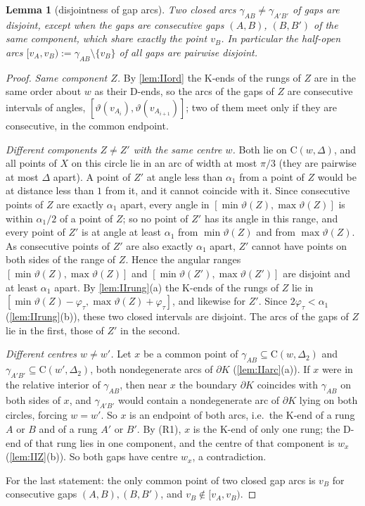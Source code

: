 \documentclass[11pt]{amsart}
\newtheorem{lemma}[theorem]{Lemma}
\theoremstyle{definition}
\theoremstyle{remark}
\newcommand{\Dt}{\Delta_2}
\newcommand{\Cc}{\mathrm{C}}      %
\begin{document}
\begin{lemma}[disjointness of gap arcs]\label{lem:IIdisj}
Two closed arcs $\gamma_{AB}\neq\gamma_{A'B'}$ of gaps are disjoint, except when the gaps are consecutive gaps $(A,B)$, $(B,B')$ of the same component, which share exactly the point $v_B$. In particular the half-open arcs $[v_A,v_B):=\gamma_{AB}\setminus\{v_B\}$ of all gaps are pairwise disjoint.
\end{lemma}
\begin{proof}
\emph{Same component $Z$.} By \cref{lem:IIord} the K-ends of the rungs of $Z$ are in the same order about $w$ as their D-ends, so the arcs of the gaps of $Z$ are consecutive intervals of angles, $[\vartheta(v_{A_i}),\vartheta(v_{A_{i+1}})]$; two of them meet only if they are consecutive, in the common endpoint.

\emph{Different components $Z\neq Z'$ with the same centre $w$.} Both lie on $\Cc(w,\Delta)$, and all points of $X$ on this circle lie in an arc of width at most $\pi/3$ (they are pairwise at most $\Delta$ apart). A point of $Z'$ at angle less than $\alpha_1$ from a point of $Z$ would be at distance less than $1$ from it, and it cannot coincide with it. Since consecutive points of $Z$ are exactly $\alpha_1$ apart, every angle in $[\min\vartheta(Z),\max\vartheta(Z)]$ is within $\alpha_1/2$ of a point of $Z$; so no point of $Z'$ has its angle in this range, and every point of $Z'$ is at angle at least $\alpha_1$ from $\min\vartheta(Z)$ and from $\max\vartheta(Z)$. As consecutive points of $Z'$ are also exactly $\alpha_1$ apart, $Z'$ cannot have points on both sides of the range of $Z$. Hence the angular ranges $[\min\vartheta(Z),\max\vartheta(Z)]$ and $[\min\vartheta(Z'),\max\vartheta(Z')]$ are disjoint and at least $\alpha_1$ apart. By \cref{lem:IIrung}(a) the K-ends of the rungs of $Z$ lie in $[\min\vartheta(Z)-\varphi_\tau,\max\vartheta(Z)+\varphi_\tau]$, and likewise for $Z'$. Since $2\varphi_\tau<\alpha_1$ (\cref{lem:IIrung}(b)), these two closed intervals are disjoint. The arcs of the gaps of $Z$ lie in the first, those of $Z'$ in the second.

\emph{Different centres $w\neq w'$.} Let $x$ be a common point of $\gamma_{AB}\subseteq\Cc(w,\Dt)$ and $\gamma_{A'B'}\subseteq\Cc(w',\Dt)$, both nondegenerate arcs of $\partial K$ (\cref{lem:IIarc}(a)). If $x$ were in the relative interior of $\gamma_{AB}$, then near $x$ the boundary $\partial K$ coincides with $\gamma_{AB}$ on both sides of $x$, and $\gamma_{A'B'}$ would contain a nondegenerate arc of $\partial K$ lying on both circles, forcing $w=w'$. So $x$ is an endpoint of both arcs, i.e.\ the K-end of a rung $A$ or $B$ and of a rung $A'$ or $B'$. By (R1), $x$ is the K-end of only one rung; the D-end of that rung lies in one component, and the centre of that component is $w_x$ (\cref{lem:IIZ}(b)). So both gaps have centre $w_x$, a contradiction.

For the last statement: the only common point of two closed gap arcs is $v_B$ for consecutive gaps $(A,B),(B,B')$, and $v_B\notin[v_A,v_B)$.
\end{proof}
\end{document}
